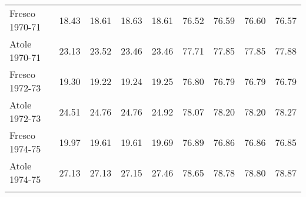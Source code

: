 \begin{table}[htbp]
{\begin{adjustbox}{max width=1\textwidth}
\begin{tabular}{lcccc|cccc}
Fresco 1970-71  &  18.43&   18.61&   18.63&   18.61&   76.52&   76.59&   76.60&   76.57\\
Atole  1970-71  &  23.13&   23.52&   23.46&   23.46&   77.71&   77.85&   77.85&   77.88\\
Fresco 1972-73  &  19.30&   19.22&   19.24&   19.25&   76.80&   76.79&   76.79&   76.79\\
Atole  1972-73  &  24.51&   24.76&   24.76&   24.92&   78.07&   78.20&   78.20&   78.27\\
Fresco 1974-75  &  19.97&   19.61&   19.61&   19.69&   76.89&   76.86&   76.86&   76.85\\
Atole  1974-75  &  27.13&   27.13&   27.15&   27.46&   78.65&   78.78&   78.80&   78.87\\
\bottomrule
\addlinespace[0.5em]
\multicolumn{9}{p{1\textwidth}}{\parbox[t]{1\textwidth}{}}\\
\end{tabular}\end{adjustbox}
}
\end{table}




